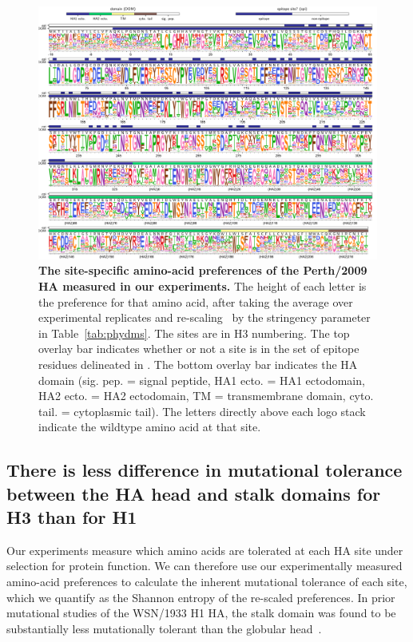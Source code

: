 \documentclass[9pt,twocolumn,twoside]{pnas-new}
\begin{document}
\begin{figure}[ht]
\centering
\includegraphics[width=17cm]{figs/prefslogoplot/rescaled-avgprefs_prefs.pdf}
\caption{\label{fig:logoplot}
{\bf The site-specific amino-acid preferences of the Perth/2009 HA measured in our experiments.}
The height of each letter is the preference for that amino acid, after taking the average over experimental replicates and re-scaling~\cite{hilton2017phydms} by the stringency parameter in Table~\ref{tab:phydms}.
The sites are in H3 numbering.
The top overlay bar indicates whether or not a site is in the set of epitope residues delineated in \cite{wolf2006long}.
The bottom overlay bar indicates the HA domain (sig. pep. = signal peptide, HA1 ecto. = HA1 ectodomain, HA2 ecto. = HA2 ectodomain, TM = transmembrane domain, cyto. tail. = cytoplasmic tail).
The letters directly above each logo stack indicate the wildtype amino acid at that site.
}
\end{figure}

\subsection*{There is less difference in mutational tolerance between the HA head and stalk domains for H3 than for H1}
Our experiments measure which amino acids are tolerated at each HA site under selection for protein function.
We can therefore use our experimentally measured amino-acid preferences to calculate the inherent mutational tolerance of each site, which we quantify as the Shannon entropy of the re-scaled preferences.
In prior mutational studies of the WSN/1933 H1 HA, the stalk domain was found to be substantially less mutationally tolerant than the globular head~\cite{thyagarajan2014inherent,wu2014high,doud2016accurate}.
\end{document}
